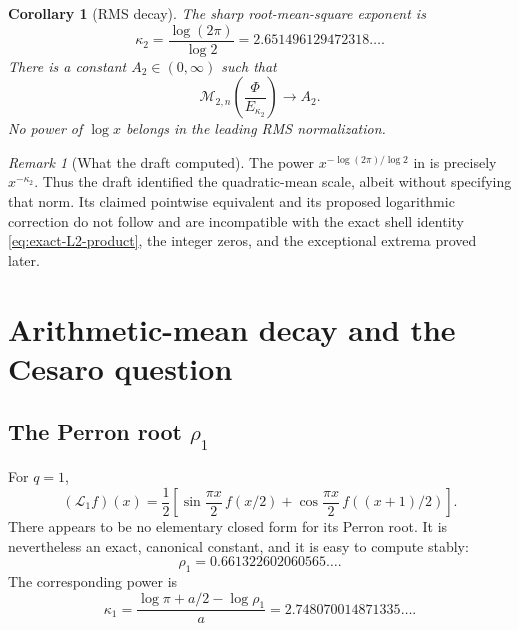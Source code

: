 \documentclass[11pt,oneside]{article}
\newtheorem{corollary}[theorem]{Corollary}
\theoremstyle{definition}
\theoremstyle{remark}
\newtheorem{remark}[theorem]{Remark}
\newcommand{\Phiup}{\Phi}
\begin{document}
\begin{corollary}[RMS decay]
\label{cor:RMS-decay}
The sharp root-mean-square exponent is
\begin{equation}
 \boxed{\displaystyle
 \kappa_2=\frac{\log(2\pi)}{\log2}
 =2.651496129472318\ldots .}
 \label{eq:kappa2}
\end{equation}
There is a constant $A_2\in(0,\infty)$ such that
\begin{equation}
 \mathcal M_{2,n}\!\left(\frac{\Phiup}{E_{\kappa_2}}\right)
 \longrightarrow A_2.
 \label{eq:RMS-limit}
\end{equation}
No power of $\log x$ belongs in the leading RMS normalization.
\end{corollary}

\begin{remark}[What the draft computed]
The power $x^{-\log(2\pi)/\log2}$ in \cite{decay-draft} is precisely
$x^{-\kappa_2}$.  Thus the draft identified the quadratic-mean scale, albeit without
specifying that norm.  Its claimed pointwise equivalent and its proposed logarithmic
correction do not follow and are incompatible with the exact shell identity
\eqref{eq:exact-L2-product}, the integer zeros, and the exceptional extrema proved later.
\end{remark}

\section{Arithmetic-mean decay and the Cesaro question}
\label{sec:L1-Cesaro}

\subsection{The Perron root $\rho_1$}

For $q=1$,
\begin{equation}
 (\mathcal L_1f)(x)
 =\frac12\left[
  \sin\frac{\pi x}{2}\,f(x/2)
 +\cos\frac{\pi x}{2}\,f((x+1)/2)
 \right].
 \label{eq:L1}
\end{equation}
There appears to be no elementary closed form for its Perron root.  It is nevertheless an
exact, canonical constant, and it is easy to compute stably:
\begin{equation}
 \rho_1=0.661322602060565\ldots .
 \label{eq:rho1-numerical}
\end{equation}
The corresponding power is
\begin{equation}
 \boxed{\displaystyle
 \kappa_1
 =\frac{\log\pi+a/2-\log\rho_1}{a}
 =2.748070014871335\ldots .}
 \label{eq:kappa1}
\end{equation}
\end{document}
